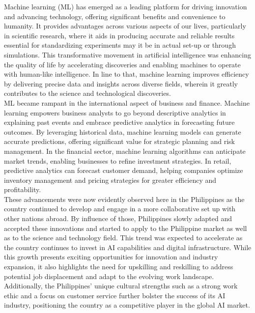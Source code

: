 \documentclass[12pt]{article}
\begin{document}
Machine learning (ML) has emerged as a leading platform for driving innovation and advancing technology, offering significant benefits and convenience to humanity. It provides advantages across various aspects of our lives, particularly in scientific research, where it aids in producing accurate and reliable results essential for standardizing experiments may it be in actual set-up or through simulations. This transformative movement in artificial intelligence was enhancing the quality of life by accelerating discoveries and enabling machines to operate with human-like intelligence. In line to that, machine learning improves efficiency by delivering precise data and insights across diverse fields, wherein it greatly contributes to the science and technological discoveries.\\
\indent ML became rampant in the international aspect of business and finance. Machine learning empowers business analysts to go beyond descriptive analytics in explaining past events and embrace predictive analytics in forecasting future outcomes. By leveraging historical data, machine learning models can generate accurate predictions, offering significant value for strategic planning and risk management. In the financial sector, machine learning algorithms can anticipate market trends, enabling businesses to refine investment strategies. In retail, predictive analytics can forecast customer demand, helping companies optimize inventory management and pricing strategies for greater efficiency and profitability.\\
\indent These advancements were now evidently observed here in the Philippines as the country continued to develop and engage in a more collaborative set up with other nations abroad. By influence of those, Philippines slowly adapted and accepted these innovations and started to apply to the Philippine market as well as to the science and technology field. This trend was expected to accelerate as the country continues to invest in AI capabilities and digital infrastructure. While this growth presents exciting opportunities for innovation and industry expansion, it also highlights the need for upskilling and reskilling to address potential job displacement and adapt to the evolving work landscape.\\ 
\indent Additionally, the Philippines' unique cultural strengths such as a strong work ethic and a focus on customer service further bolster the success of its AI industry, positioning the country as a competitive player in the global AI market.
\end{document}
